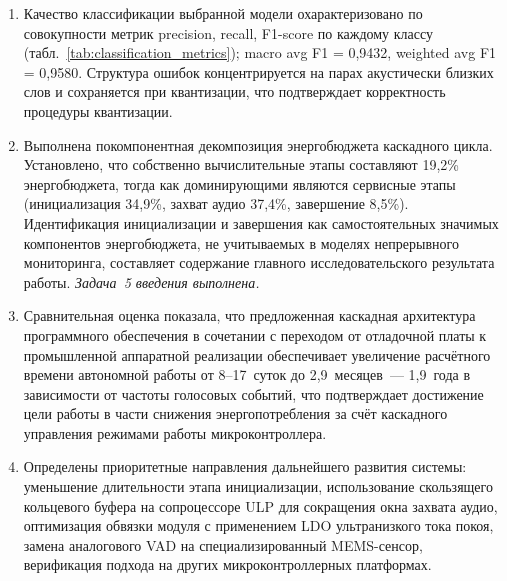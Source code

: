 \begin{enumerate}
	\item Качество классификации выбранной модели
	      охарактеризовано по совокупности метрик precision,
	      recall, F1-score по каждому классу
	      (табл.~\ref{tab:classification_metrics}); macro avg
	      F1 = 0,9432, weighted avg F1 = 0,9580. Структура
	      ошибок концентрируется на парах акустически близких
	      слов и сохраняется при квантизации, что подтверждает
	      корректность процедуры квантизации.

	\item Выполнена покомпонентная декомпозиция энергобюджета
	      каскадного цикла. Установлено, что собственно
	      вычислительные этапы составляют 19,2\% энергобюджета,
	      тогда как доминирующими являются сервисные этапы
	      (инициализация 34,9\%, захват аудио 37,4\%,
	      завершение 8,5\%). Идентификация инициализации и
	      завершения как самостоятельных значимых компонентов
	      энергобюджета, не учитываемых в моделях непрерывного
	      мониторинга, составляет содержание главного
	      исследовательского результата работы.
	      \textit{Задача~5 введения выполнена.}

	\item Сравнительная оценка показала, что предложенная
	      каскадная архитектура программного обеспечения в
	      сочетании с переходом от отладочной платы к
	      промышленной аппаратной реализации обеспечивает
	      увеличение расчётного времени автономной работы от
	      8--17~суток до 2,9~месяцев~--- 1,9~года в зависимости
	      от частоты голосовых событий, что подтверждает
	      достижение цели работы в части снижения
	      энергопотребления за счёт каскадного управления
	      режимами работы микроконтроллера.

	\item Определены приоритетные направления дальнейшего
	      развития системы: уменьшение длительности этапа
	      инициализации, использование скользящего кольцевого
	      буфера на сопроцессоре ULP для сокращения окна
	      захвата аудио, оптимизация обвязки модуля с
	      применением LDO ультранизкого тока покоя, замена
	      аналогового VAD на специализированный MEMS-сенсор,
	      верификация подхода на других микроконтроллерных
	      платформах.
\end{enumerate}
